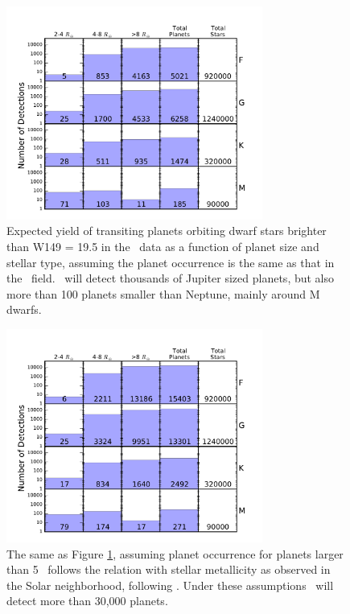 \begin{figure}[htbp!]
\centerline{\includegraphics[width=0.75\textwidth]{chapter8/f5b_n.pdf}}
\caption[Expected transiting planet yield from \WF\ assuming planet occurrence is the same as that in
the \kep\ field]{Expected yield of transiting planets orbiting dwarf stars
  brighter than W149 = 19.5 in the \WF\ data as a function of
  planet size and stellar type, assuming the planet occurrence is the same as that in the \kep\ 
  field. \WF\ will detect thousands of Jupiter sized planets, but also more than 100 planets
  smaller than Neptune, mainly around M dwarfs. }
\label{fig:yield1}
\end{figure}


\begin{figure}[htbp!]
\centerline{\includegraphics[width=0.75\textwidth]{chapter8/f5a_n.pdf}}
\caption[Expected transiting planet yield from \WF\ assuming giant planet occurrence follows the same
relation with metallicity as observed in the Solar neighborhood]{The same as Figure \ref{fig:yield1}, assuming planet occurrence for planets
larger than 5 \rearth\ follows
the relation with stellar metallicity as observed in the Solar neighborhood,
following \citet{JohnsonApps09}. Under these assumptions \WF\ will detect 
more than 30,000 planets.}
\label{fig:yield2}
\end{figure}



